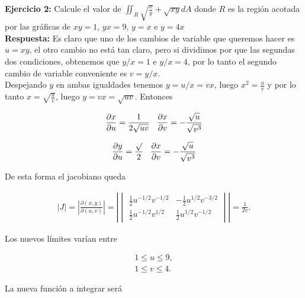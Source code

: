 \documentclass{article}
\theoremstyle{definition}
\begin{document}
\textbf{Ejercicio 2:} Calcule el valor de $\displaystyle \iint_{R} \sqrt{\frac{x}{y}}+ \sqrt{xy} dA$ donde $R$ es la regi\'on acotada por las gr\'aficas de $xy=1$, $yx=9$, $y=x$ e $y=4x$ \\

\textbf{Respuesta:} Es claro que uno de los cambios de variable que queremos hacer es $u=xy$, el otro cambio no est\'a tan claro, pero si dividimos por que las segundas dos condiciones, obtenemos que $y/x= 1$ e $y/x=4$, por lo tanto el segundo cambio de variable conveniente es $v= y/x$. \\

Despejando $y$ en ambas igualdades tenemos $y=u/x=vx$, luego $x^2=\displaystyle \frac{u}{v}$ y por lo tanto $\displaystyle x =\sqrt{\frac{u}{v}}$, luego $y = \displaystyle vx = \sqrt{uv}$. Entonces 

\begin{align*}
    \frac{\partial x}{\partial u} = \frac{1}{2\sqrt{uv}} \hspace{0.3cm}   \frac{\partial x}{\partial v} = -\frac{\sqrt{u}}{\sqrt{v^3}} 
\end{align*}

\begin{align*}
    \frac{\partial y}{\partial u} = \frac{\sqrt{}}{2} \hspace{0.3cm}   \frac{\partial x}{\partial v} = -\frac{\sqrt{u}}{\sqrt{v^3}} 
\end{align*}



De esta forma el jacobiano queda

\begin{align*}
|J| = \left| \frac{\partial(x, y)}{\partial(u, v)} \right| 
= \left|
\begin{vmatrix}
\frac{1}{2} u^{-1/2} v^{-1/2} & -\frac{1}{2} u^{1/2} v^{-3/2} \\
\frac{1}{2} u^{-1/2} v^{1/2} & \frac{1}{2} u^{1/2} v^{-1/2}
\end{vmatrix}
\right|
= \frac{1}{2v}.
\end{align*}

\vspace{0.3cm}

Los nuevos l\'imites var\'ian entre

\begin{align*}
1 \leq u \leq 9, \\
1 \leq v \leq 4. 
\end{align*}

La nueva funci\'on a integrar ser\'a
\end{document}
